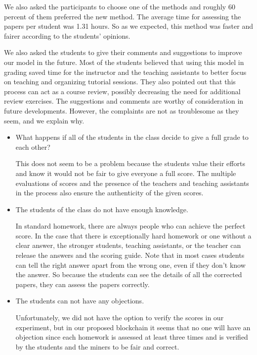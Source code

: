 \documentclass[manuscript,review,anonymous]{acmart}%
\begin{document}
We also asked the participants to choose one of the methods and roughly 60 percent of them preferred the new method.
The average time for assessing the papers per student was 1.31 hours.
So as we expected, this method was faster and fairer according to the students' opinions.

We also asked the students to give their comments and suggestions to improve our model in the future.
Most of the students believed that using this model in grading saved time for the instructor and the teaching assistants to better focus on teaching and organizing tutorial sessions. They also pointed out that this process can act as a course review, possibly decreasing the need for additional review exercises.
The suggestions and comments are worthy of consideration in future developments. However, the complaints are not as troublesome as they seem, and we explain why.
\begin{itemize}
\item What happens if all of the students in the class decide to give a full grade to each other?

This does not seem to be a problem because the students value their efforts and know it would not be fair to give everyone a full score.
The multiple evaluations of scores and the presence of the teachers and teaching assistants in the process also ensure the authenticity of the given scores.

\item The students of the class do not have enough knowledge.

In standard homework, there are always people who can achieve the perfect score. 
In the case that there is exceptionally hard homework or one without a clear answer, the stronger students, teaching assistants, or the teacher can release the answers and the scoring guide.
Note that in most cases students can tell the right answer apart from the wrong one, even if they don't know the answer. So
because the students can see the details of all the corrected papers, they can assess the papers correctly.

\item The students can not have any objections.

Unfortunately, we did not have the option to verify the scores in our experiment, but in our proposed blockchain it seems that no one will have an objection since each homework is assessed at least three times and is verified by the students and the miners to be fair and correct.



\end{itemize} 
\end{document}
